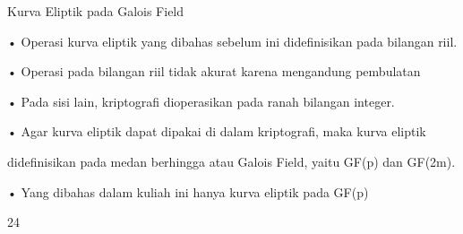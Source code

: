 \documentclass{article}
\begin{document}

Kurva Eliptik pada Galois Field

• Operasi kurva eliptik yang dibahas sebelum ini didefinisikan pada bilangan riil.

• Operasi pada bilangan riil tidak akurat karena mengandung pembulatan

• Pada sisi lain, kriptografi dioperasikan pada ranah bilangan integer.

• Agar kurva eliptik dapat dipakai di dalam kriptografi, maka kurva eliptik 

didefinisikan pada medan berhingga atau Galois Field, yaitu GF(p) dan GF(2m).

• Yang dibahas dalam kuliah ini hanya kurva eliptik pada GF(p)

24
\end{document}
